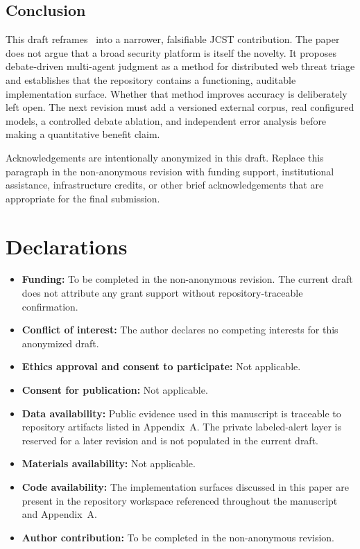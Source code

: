 \subsection{Conclusion}

This draft reframes \system\ into a narrower, falsifiable JCST contribution. The paper does not argue that a broad security platform is itself the novelty. It proposes debate-driven multi-agent judgment as a method for distributed web threat triage and establishes that the repository contains a functioning, auditable implementation surface. Whether that method improves accuracy is deliberately left open. The next revision must add a versioned external corpus, real configured models, a controlled debate ablation, and independent error analysis before making a quantitative benefit claim.


Acknowledgements are intentionally anonymized in this draft. Replace this paragraph in the non-anonymous revision with funding support, institutional assistance, infrastructure credits, or other brief acknowledgements that are appropriate for the final submission.

\section*{Declarations}

\begin{itemize}
  \item \textbf{Funding:} To be completed in the non-anonymous revision. The current draft does not attribute any grant support without repository-traceable confirmation.
  \item \textbf{Conflict of interest:} The author declares no competing interests for this anonymized draft.
  \item \textbf{Ethics approval and consent to participate:} Not applicable.
  \item \textbf{Consent for publication:} Not applicable.
  \item \textbf{Data availability:} Public evidence used in this manuscript is traceable to repository artifacts listed in Appendix~A. The private labeled-alert layer is reserved for a later revision and is not populated in the current draft.
  \item \textbf{Materials availability:} Not applicable.
  \item \textbf{Code availability:} The implementation surfaces discussed in this paper are present in the repository workspace referenced throughout the manuscript and Appendix~A.
  \item \textbf{Author contribution:} To be completed in the non-anonymous revision.
\end{itemize}
